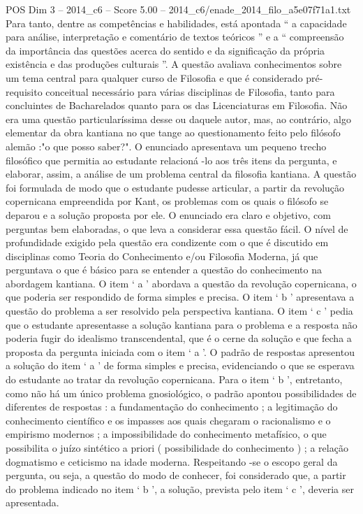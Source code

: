 \begin{textsample}{POS Dim 3 – 2014\_c6 – Score 5.00 – 2014\_c6/enade\_2014\_filo\_a5e07f71a1.txt}
Para tanto, dentre as competências e habilidades, está apontada “ a capacidade para análise, interpretação e comentário de textos teóricos ” e a “ compreensão da importância das questões acerca do sentido e da significação da própria existência e das produções culturais ”.
A questão avaliava conhecimentos sobre um tema central para qualquer curso de Filosofia e que é considerado pré-requisito conceitual necessário para várias disciplinas de Filosofia, tanto para concluintes de Bacharelados quanto para os das Licenciaturas em Filosofia.
Não era uma questão particularíssima desse ou daquele autor, mas, ao contrário, algo elementar da obra kantiana no que tange ao questionamento feito pelo filósofo alemão :"o que posso saber?".
O enunciado apresentava um pequeno trecho filosófico que permitia ao estudante relacioná -lo aos três itens da pergunta, e elaborar, assim, a análise de um problema central da filosofia kantiana.
A questão foi formulada de modo que o estudante pudesse articular, a partir da revolução copernicana empreendida por Kant, os problemas com os quais o filósofo se deparou e a solução proposta por ele.
O enunciado era claro e objetivo, com perguntas bem elaboradas, o que leva a considerar essa questão fácil.
O nível de profundidade exigido pela questão era condizente com o que é discutido em disciplinas como Teoria do Conhecimento e/ou Filosofia Moderna, já que perguntava o que é básico para se entender a questão do conhecimento na abordagem kantiana.
O item ‘ a ’ abordava a questão da revolução copernicana, o que poderia ser respondido de forma simples e precisa.
O item ‘ b ’ apresentava a questão do problema a ser resolvido pela perspectiva kantiana.
O item ‘ c ’ pedia que o estudante apresentasse a solução kantiana para o problema e a resposta não poderia fugir do idealismo transcendental, que é o cerne da solução e que fecha a proposta da pergunta iniciada com o item ‘ a ’.
O padrão de respostas apresentou a solução do item ‘ a ’ de forma simples e precisa, evidenciando o que se esperava do estudante ao tratar da revolução copernicana.
Para o item ‘ b ’, entretanto, como não há um único problema gnosiológico, o padrão apontou possibilidades de diferentes de respostas : a fundamentação do conhecimento ; a legitimação do conhecimento científico e os impasses aos quais chegaram o racionalismo e o empirismo modernos ; a impossibilidade do conhecimento metafísico, o que possibilita o juízo sintético a priori ( possibilidade do conhecimento ) ; a relação dogmatismo e ceticismo na idade moderna.
Respeitando -se o escopo geral da pergunta, ou seja, a questão do modo de conhecer, foi considerado que, a partir do problema indicado no item ‘ b ’, a solução, prevista pelo item ‘ c ’, deveria ser apresentada.

\end{textsample}

